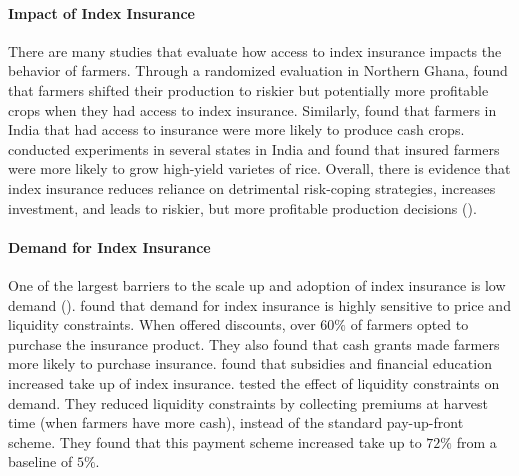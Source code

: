 \documentclass[11pt]{article}
\begin{document}
\paragraph{Impact of Index Insurance} There are many studies that evaluate how access to index insurance impacts the behavior of farmers. Through a randomized evaluation in Northern Ghana, \cite{karlan2014agricultural} found that farmers shifted their production to riskier but potentially more profitable crops when they had access to index insurance. Similarly, \cite{cole2013barriers} found that farmers in India that had access to insurance were more likely to produce cash crops. \cite{mobarak2013informal} conducted experiments in several states in India and found that insured farmers were more likely to grow high-yield varietes of rice. Overall, there is evidence that index insurance reduces reliance on detrimental risk-coping strategies, increases investment, and leads to riskier, but more profitable production decisions (\cite{jensen2017agricultural}). 

\paragraph{Demand for Index Insurance} One of the largest barriers to the scale up and adoption of index insurance is low demand (\cite{jensen2017agricultural}). \cite{cole2013barriers} found that demand for index insurance is highly sensitive to price and liquidity constraints. When offered discounts, over $60\%$ of farmers opted to purchase the insurance product. They also found that cash grants made farmers more likely to purchase insurance. \cite{cai2020subsidy} found that subsidies and financial education increased take up of index insurance. \cite{casaburi2018time} tested the effect of liquidity constraints on demand. They reduced liquidity constraints by collecting premiums at harvest time (when farmers have more cash), instead of the standard pay-up-front scheme. They found that this payment scheme increased take up to $72\%$ from a baseline of $5\%$. 
\end{document}
